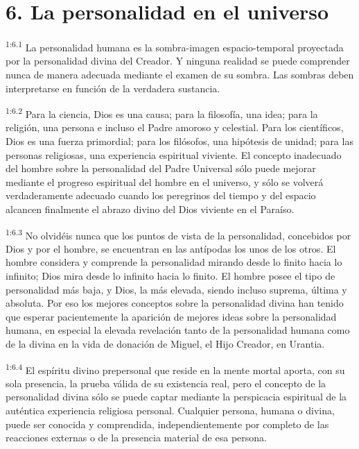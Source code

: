 \section*{6. La personalidad en el universo}
\par
\textsuperscript{1:6.1} La personalidad humana es la sombra-imagen espacio-temporal proyectada por la personalidad divina del Creador. Y ninguna realidad se puede comprender nunca de manera adecuada mediante el examen de su sombra. Las sombras deben interpretarse en función de la verdadera sustancia.

\par
\textsuperscript{1:6.2} Para la ciencia, Dios es una causa; para la filosofía, una idea; para la religión, una persona e incluso el Padre amoroso y celestial. Para los científicos, Dios es una fuerza primordial; para los filósofos, una hipótesis de unidad; para las personas religiosas, una experiencia espiritual viviente. El concepto inadecuado del hombre sobre la personalidad del Padre Universal sólo puede mejorar mediante el progreso espiritual del hombre en el universo, y sólo se volverá verdaderamente adecuado cuando los peregrinos del tiempo y del espacio alcancen finalmente el abrazo divino del Dios viviente en el Paraíso.

\par
\textsuperscript{1:6.3} No olvidéis nunca que los puntos de vista de la personalidad, concebidos por Dios y por el hombre, se encuentran en las antípodas los unos de los otros. El hombre considera y comprende la personalidad mirando desde lo finito hacia lo infinito; Dios mira desde lo infinito hacia lo finito. El hombre posee el tipo de personalidad más baja, y Dios, la más elevada, siendo incluso suprema, última y absoluta. Por eso los mejores conceptos sobre la personalidad divina han tenido que esperar pacientemente la aparición de mejores ideas sobre la personalidad humana, en especial la elevada revelación tanto de la personalidad humana como de la divina en la vida de donación de Miguel, el Hijo Creador, en Urantia.

\par
\textsuperscript{1:6.4} El espíritu divino prepersonal que reside en la mente mortal aporta, con su sola presencia, la prueba válida de su existencia real, pero el concepto de la personalidad divina sólo se puede captar mediante la perspicacia espiritual de la auténtica experiencia religiosa personal. Cualquier persona, humana o divina, puede ser conocida y comprendida, independientemente por completo de las reacciones externas o de la presencia material de esa persona.

